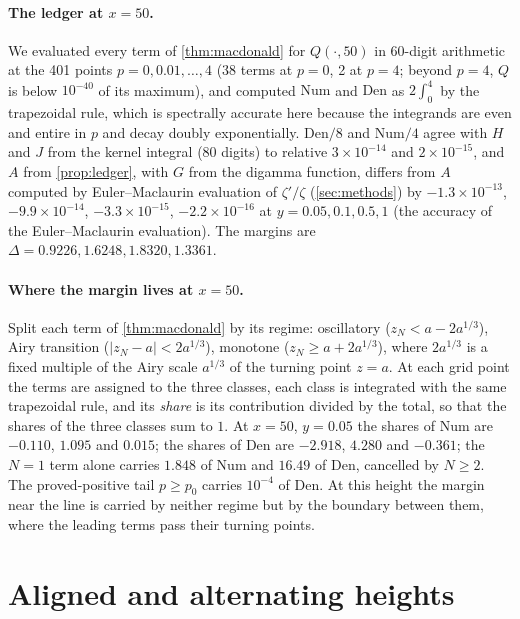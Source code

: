 \documentclass[11pt]{article}
\theoremstyle{definition}\newtheorem{definition}[theorem]{Definition}
\theoremstyle{remark}\newtheorem{remark}[theorem]{Remark}
\newcommand{\Num}{\mathrm{Num}}\newcommand{\Den}{\mathrm{Den}}
\begin{document}
\paragraph{The ledger at $x=50$.} We evaluated every term of \cref{thm:macdonald} for $Q(\cdot,50)$ in 60-digit arithmetic at the 401 points $p=0,0.01,\dots,4$ (38 terms at $p=0$, 2 at $p=4$; beyond $p=4$, $Q$ is below $10^{-40}$ of its maximum), and computed $\Num$ and $\Den$ as $2\int_0^4$ by the trapezoidal rule, which is spectrally accurate here because the integrands are even and entire in $p$ and decay doubly exponentially. $\Den/8$ and $\Num/4$ agree with $H$ and $J$ from the kernel integral (80 digits) to relative $3\times10^{-14}$ and $2\times10^{-15}$, and $A$ from \cref{prop:ledger}, with $G$ from the digamma function, differs from $A$ computed by Euler--Maclaurin evaluation of $\zeta'/\zeta$ (\cref{sec:methods}) by $-1.3\times10^{-13}$, $-9.9\times10^{-14}$, $-3.3\times10^{-15}$, $-2.2\times10^{-16}$ at $y=0.05,0.1,0.5,1$ (the accuracy of the Euler--Maclaurin evaluation). The margins are $\Delta=0.9226,1.6248,1.8320,1.3361$.

\paragraph{Where the margin lives at $x=50$.} Split each term of \cref{thm:macdonald} by its regime: oscillatory ($z_N<a-2a^{1/3}$), Airy transition ($|z_N-a|<2a^{1/3}$), monotone ($z_N\ge a+2a^{1/3}$), where $2a^{1/3}$ is a fixed multiple of the Airy scale $a^{1/3}$ of the turning point $z=a$. At each grid point the terms are assigned to the three classes, each class is integrated with the same trapezoidal rule, and its \emph{share} is its contribution divided by the total, so that the shares of the three classes sum to $1$. At $x=50$, $y=0.05$ the shares of $\Num$ are $-0.110$, $1.095$ and $0.015$; the shares of $\Den$ are $-2.918$, $4.280$ and $-0.361$; the $N=1$ term alone carries $1.848$ of $\Num$ and $16.49$ of $\Den$, cancelled by $N\ge2$. The proved-positive tail $p\ge p_0$ carries $10^{-4}$ of $\Den$. At this height the margin near the line is carried by neither regime but by the boundary between them, where the leading terms pass their turning points.

\section{Aligned and alternating heights}\label{sec:heights}
\end{document}
